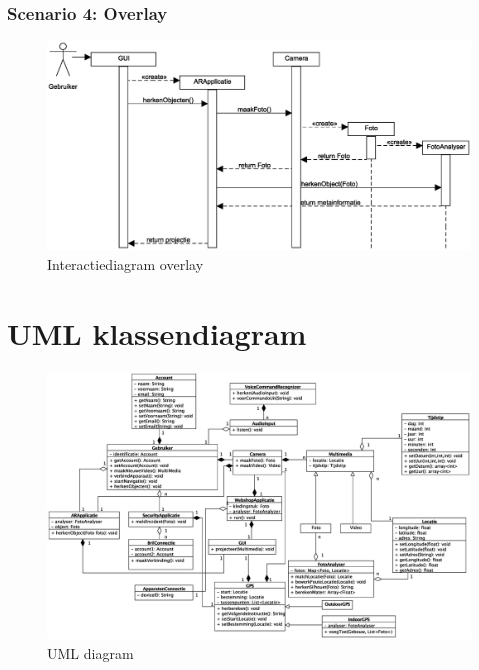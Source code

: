 \documentclass[12pt,a4paper,oneside]{article}
\begin{document}
\subsubsection*{Scenario 4: Overlay}
\begin{figure}[H]
  \begin{center}
    \includegraphics[width=\textwidth]{overlay_sequentie.eps}
    \caption{Interactiediagram overlay}
    \label{graph:graph1}
  \end{center}
\end{figure}


\section{UML klassendiagram}
\begin{figure}[H]
  \begin{center}
    \includegraphics[width=\textwidth]{uml_diagram2.eps}
    \caption{UML diagram}
    \label{graph:graph1}
  \end{center}
\end{figure}
\end{document}
